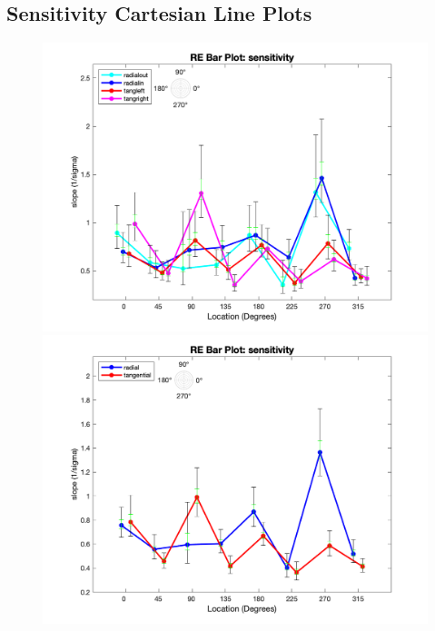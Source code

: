 \documentclass[11pt]{article} %
\begin{document}
\subsection{Sensitivity Cartesian Line Plots}
\begin{figure}[H]
\centering %
\includegraphics[scale=.3]{Images/RE_LP_sensitivity_Alldata_4conds.png}
\includegraphics[scale=.3]{Images/RE_LP_sensitivity_Alldata_2conds.png}
\end{figure}
\end{document}
